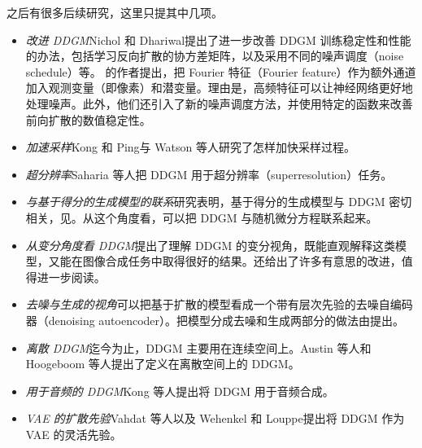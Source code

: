 之后有很多后续研究，这里只提其中几项。
\begin{itemize}
\item \emph{改进 DDGM}\quad Nichol 和 Dhariwal提出了进一步改善 DDGM 训练稳定性和性能的办法，包括学习反向扩散的协方差矩阵，以及采用不同的噪声调度（noise schedule）等。
的作者提出，把 Fourier 特征（Fourier feature）作为额外通道加入观测变量（即像素）和潜变量。理由是，高频特征可以让神经网络更好地处理噪声。此外，他们还引入了新的噪声调度方法，并使用特定的函数来改善前向扩散的数值稳定性。
\item \emph{加速采样}\quad Kong 和 Ping与 Watson 等人研究了怎样加快采样过程。
\item \emph{超分辨率}\quad Saharia 等人把 DDGM 用于超分辨率（superresolution）任务。
\item \emph{与基于得分的生成模型的联系}\quad 研究表明，基于得分的生成模型与 DDGM 密切相关，见。从这个角度看，可以把 DDGM 与随机微分方程联系起来。
\item \emph{从变分角度看 DDGM}\quad {}提出了理解 DDGM 的变分视角，既能直观解释这类模型，又能在图像合成任务中取得很好的结果。还给出了许多有意思的改进，值得进一步阅读。
\item \emph{去噪与生成的视角}\quad 可以把基于扩散的模型看成一个带有层次先验的去噪自编码器（denoising autoencoder）。把模型分成去噪和生成两部分的做法由提出。
\item \emph{离散 DDGM}\quad 迄今为止，DDGM 主要用在连续空间上。Austin 等人和 Hoogeboom 等人提出了定义在离散空间上的 DDGM。
\item \emph{用于音频的 DDGM}\quad Kong 等人提出将 DDGM 用于音频合成。
\item \emph{VAE 的扩散先验}\quad Vahdat 等人以及 Wehenkel 和 Louppe提出将 DDGM 作为 VAE 的灵活先验。
\end{itemize}

